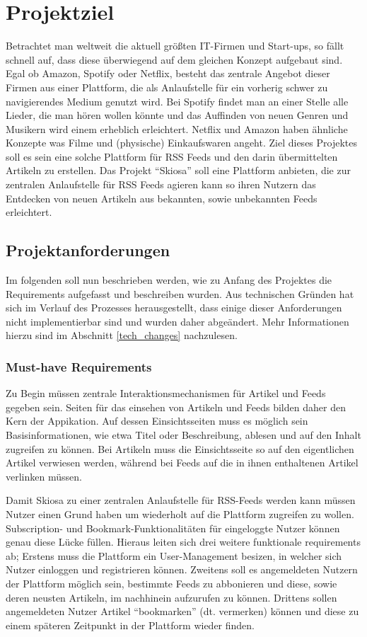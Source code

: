 
\chapter{Projektziel}

Betrachtet man weltweit die aktuell größten IT-Firmen und Start-ups, so fällt schnell auf, dass diese überwiegend auf dem gleichen Konzept aufgebaut sind.
Egal ob Amazon, Spotify oder Netflix, besteht das zentrale Angebot dieser Firmen aus einer Plattform, die als Anlaufstelle für ein vorherig schwer zu navigierendes Medium genutzt wird.
Bei Spotify findet man an einer Stelle alle Lieder, die man hören wollen könnte und das Auffinden von neuen Genren und Musikern wird einem erheblich erleichtert.
Netflix und Amazon haben ähnliche Konzepte was Filme und (physische) Einkaufswaren angeht.
Ziel dieses Projektes soll es sein eine solche Plattform für RSS Feeds und den darin übermittelten Artikeln zu erstellen.
Das Projekt ``Skiosa'' soll eine Plattform anbieten, die zur zentralen Anlaufstelle für RSS Feeds agieren kann so ihren Nutzern das Entdecken von neuen Artikeln aus bekannten, sowie unbekannten Feeds erleichtert.

\section{Projektanforderungen}
Im folgenden soll nun beschrieben werden, wie zu Anfang des Projektes die Requirements aufgefasst und beschreiben wurden.
Aus technischen Gründen hat sich im Verlauf des Prozesses herausgestellt, dass einige dieser Anforderungen nicht implementierbar sind und wurden daher abgeändert.
Mehr Informationen hierzu sind im Abschnitt \ref{tech_changes} nachzulesen.

\subsection{Must-have Requirements}
Zu Begin müssen zentrale Interaktionsmechanismen für Artikel und Feeds gegeben sein.
Seiten für das einsehen von Artikeln und Feeds bilden daher den Kern der Appikation.
Auf dessen Einsichtsseiten muss es möglich sein Basisinformationen, wie etwa Titel oder Beschreibung, ablesen und auf den Inhalt zugreifen zu können.
Bei Artikeln muss die Einsichtsseite so auf den eigentlichen Artikel verwiesen werden, während bei Feeds auf die in ihnen enthaltenen Artikel verlinken müssen.

Damit Skiosa zu einer zentralen Anlaufstelle für RSS-Feeds werden kann müssen Nutzer einen Grund haben um wiederholt auf die Plattform zugreifen zu wollen.
Subscription- und Bookmark-Funktionalitäten für eingeloggte Nutzer können genau diese Lücke füllen.
Hieraus leiten sich drei weitere funktionale requirements ab;
Erstens muss die Plattform ein User-Management besizen, in welcher sich Nutzer einloggen und registrieren können.
Zweitens soll es angemeldeten Nutzern der Plattform möglich sein, bestimmte Feeds zu abbonieren und diese, sowie deren neusten Artikeln, im nachhinein aufzurufen zu können.
Drittens sollen angemeldeten Nutzer Artikel ``bookmarken'' (dt. vermerken) können und diese zu einem späteren Zeitpunkt in der Plattform wieder finden.

